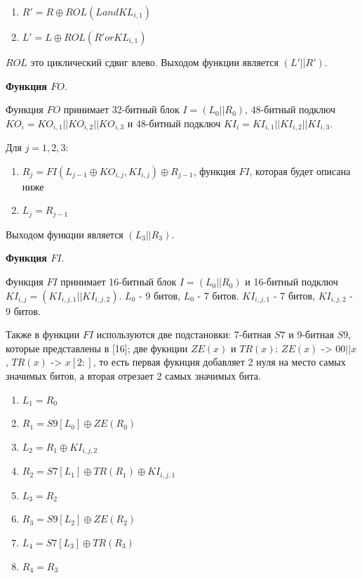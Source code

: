 \documentclass[colorthm]{./civarticle}
\begin{document}
\begin{enumerate}
    \item $R' = R \oplus ROL(L and KL_{i,1})$
    \item $L' = L \oplus ROL(R' or KL_{i,1})$
\end{enumerate}

$ROL$ это циклический сдвиг влево. Выходом функции является $(L'||R')$.

\textbf{Функция $FO$}.

Функция $FO$ принимает 32-битный блок $I=(L_0||R_0)$, 48-битный подключ $KO_i = KO_{i,1}||KO_{i,2}||KO_{i,3}$ и 48-битный подключ $KI_i = KI_{i,1}||KI_{i,2}||KI_{i,3}$.

Для $j=1,2,3$:

\begin{enumerate}
    \item $R_j = FI(L_{j-1} \oplus KO_{i,j}, KI_{i, j}) \oplus R_{j-1}$, функция $FI$, которая будет описана ниже
    \item $L_j = R_{j-1}$
\end{enumerate}

Выходом функции является $(L_3||R_3)$.

\textbf{Функция $FI$}.

Функция $FI$ принимает 16-битный блок $I=(L_0||R_0)$ и 16-битный подключ $KI_{i, j} = (KI_{i, j, 1}||KI_{i, j, 2})$. $L_0$ - 9 битов, $L_0$ - 7 битов. $KI_{i, j, 1}$ - 7 битов, $KI_{i, j, 2}$ - 9 битов. 

Также в функции $FI$ используются две подстановки: 7-битная $S7$ и 9-битная $S9$, которые представлены в [16]; две фукнции $ZE(x)$ и $TR(x)$: $ZE(x)$ -> $00||x$, $TR(x)$ -> $x[2:]$, то есть первая фукнция добавляет 2 нуля на место самых значимых битов, а вторая отрезает 2 самых значимых бита.  

\begin{enumerate}
    \item $L_1 = R_0$
    \item $R_1 = S9[L_0] \oplus ZE(R_0)$
    \item $L_2 = R_1 \oplus KI_{i, j, 2}$
    \item $R_2 = S7[L_1] \oplus TR(R_1) \oplus KI_{i, j, 1}$
    \item $L_3 = R_2$
    \item $R_3 = S9[L_2] \oplus ZE(R_2)$
    \item $L_4 = S7[L_3] \oplus TR(R_3)$
    \item $R_4 = R_3$
\end{enumerate}
\end{document}
